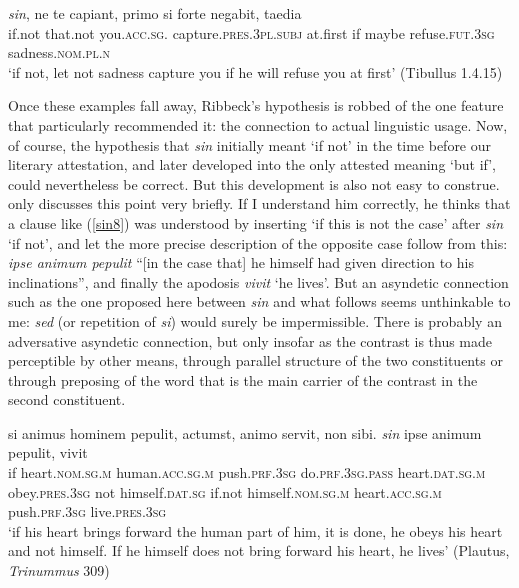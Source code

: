 \begin{exe}
\ex
\gll \emph{sin}, ne te capiant, primo si forte negabit, taedia\\
if.not that.not you.\textsc{acc.sg.} capture.\textsc{pres.3pl.subj} at.first if maybe refuse.\textsc{fut.3sg} sadness.\textsc{nom.pl.n}\\
\trans `if not, let not sadness capture you if he will refuse you at first' (Tibullus 1.4.15)
\label{sin7}
\end{exe}

Once these examples fall away, Ribbeck's \citeyearpar{Ribbeck1869} hypothesis is robbed of the one feature that particularly recommended it: the connection to actual linguistic usage. Now, of course, the hypothesis that \emph{sin} initially meant `if not' in the time before our literary attestation, and later developed into the only attested meaning `but if', could nevertheless be correct. But this development is also not easy to construe. \citeauthor{Ribbeck1869} only discusses this point very briefly. If I understand him correctly, he thinks that a clause like (\ref{sin8}) was understood by inserting `if this is not the case' after \emph{sin} `if not', and let the more precise description of the opposite case follow from this: \emph{ipse animum pepulit} ``[in the case that] he himself had given direction to his inclinations'', and finally the apodosis \emph{vivit} `he lives'. But an asyndetic connection such as the one proposed here between \emph{sin} and what follows seems unthinkable to me: \emph{sed} (or repetition of \emph{si}) would surely be impermissible. There is probably an adversative asyndetic connection, but only insofar as the contrast is thus made perceptible by other means, through parallel structure of the two constituents or through preposing of the word that is the main carrier of the contrast in the second constituent.

\begin{exe}
\ex
\gll si animus hominem pepulit, actumst, animo servit, non sibi. \emph{sin} ipse animum pepulit, vivit\\
if heart.\textsc{nom.sg.m} human.\textsc{acc.sg.m} push.\textsc{prf.3sg} do.\textsc{prf.3sg.pass} heart.\textsc{dat.sg.m} obey.\textsc{pres.3sg} not himself.\textsc{dat.sg} if.not himself.\textsc{nom.sg.m} heart.\textsc{acc.sg.m} push.\textsc{prf.3sg} live.\textsc{pres.3sg}\\
\trans `if his heart brings forward the human part of him, it is done, he obeys his heart and not himself. If he himself does not bring forward his heart, he lives' (Plautus, \textit{Trinummus} 309)
\label{sin8}
\end{exe}

